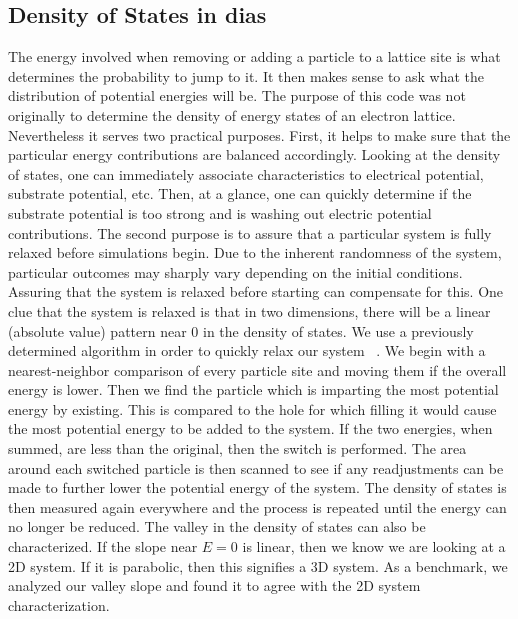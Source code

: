 \subsection {Density of States in {\sc dias}}
The energy involved when removing or adding a particle to a lattice site is what determines the probability to jump to it. It then makes sense to ask what the distribution of potential energies will be. The purpose of this code was not originally to determine the density of energy states of an electron lattice. Nevertheless it serves two practical purposes. First, it helps to make sure that the particular energy contributions are balanced accordingly. Looking at the density of states, one can immediately associate characteristics to electrical potential, substrate potential, etc. Then, at a glance, one can quickly determine if the substrate potential is too strong and is washing out electric potential contributions. The second purpose is to assure that a particular system is fully relaxed before simulations begin. Due to the inherent randomness of the system, particular outcomes may sharply vary depending on the initial conditions. Assuring that the system is relaxed before starting can compensate for this. One clue that the system is relaxed is that in two dimensions, there will be a linear (absolute value) pattern near $0$ in the density of states. We use a previously determined algorithm in order to quickly relax our system ~\cite{Vinokur08}. We begin with a nearest-neighbor comparison of every particle site and moving them if the overall energy is lower. Then we find the particle which is imparting the most potential energy by existing. This is compared to the hole for which filling it would cause the most potential energy to be added to the system. If the two energies, when summed, are less than the original, then the switch is performed. The area around each switched particle is then scanned to see if any readjustments can be made to further lower the potential energy of the system. The density of states is then measured again everywhere and the process is repeated until the energy can no longer be reduced. The valley in the density of states can also be characterized. If the slope near $E=0$ is linear, then we know we are looking at a 2D system. If it is parabolic, then this signifies a 3D system. As a benchmark, we analyzed our valley slope and found it to agree with the 2D system characterization.


